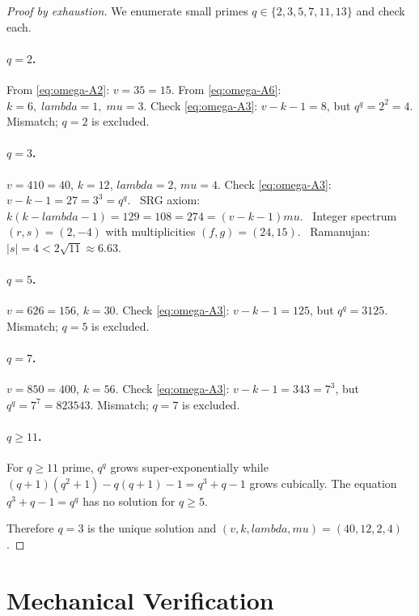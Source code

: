 \documentclass[12pt,a4paper]{article}
\def\lambda{lambda}%
\def\mu{mu}%
\def\cdot{ }%
\theoremstyle{definition}
\begin{document}
\begin{proof}[Proof by exhaustion]
We enumerate small primes $q \in \{2,3,5,7,11,13\}$ and check each.

\paragraph{$q=2$.}
From \eqref{eq:omega-A2}: $v = 3\cdot 5 = 15$. From \eqref{eq:omega-A6}:
$k=6,\;\lambda=1,\;\mu=3$. Check \eqref{eq:omega-A3}: $v-k-1 = 8$, but
$q^q = 2^2 = 4$. Mismatch; $q=2$ is excluded.

\paragraph{$q=3$.}
$v = 4\cdot 10 = 40$, $k=12$, $\lambda=2$, $\mu=4$. Check \eqref{eq:omega-A3}:
$v-k-1 = 27 = 3^3 = q^q$. \checkmark\ SRG axiom:
$k(k-\lambda-1)=12\cdot 9 = 108 = 27\cdot 4 = (v-k-1)\mu$. \checkmark\ Integer
spectrum $(r,s)=(2,-4)$ with multiplicities $(f,g)=(24,15)$. \checkmark\
Ramanujan: $|s|=4 < 2\sqrt{11}\approx 6.63$. \checkmark

\paragraph{$q=5$.}
$v = 6\cdot 26 = 156$, $k=30$. Check \eqref{eq:omega-A3}: $v-k-1 = 125$,
but $q^q = 3125$. Mismatch; $q=5$ is excluded.

\paragraph{$q=7$.}
$v = 8\cdot 50 = 400$, $k=56$. Check \eqref{eq:omega-A3}: $v-k-1 = 343 = 7^3$,
but $q^q = 7^7 = 823543$. Mismatch; $q=7$ is excluded.

\paragraph{$q\ge 11$.}
For $q\ge 11$ prime, $q^q$ grows super-exponentially while
$(q+1)(q^2+1) - q(q+1) - 1 = q^3 + q - 1$ grows cubically. The equation
$q^3 + q - 1 = q^q$ has no solution for $q\ge 5$.

Therefore $q=3$ is the unique solution and
$(v,k,\lambda,\mu)=(40,12,2,4)$.
\end{proof}

\section*{Mechanical Verification}
\end{document}
